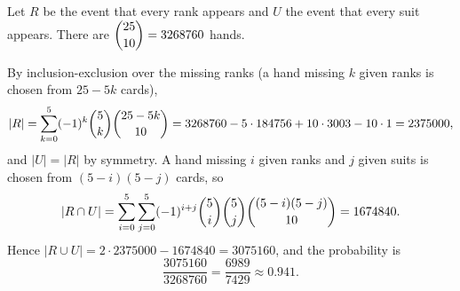 Let $R$ be the event that every rank appears and $U$ the event that every suit appears. There are $\dbinom{25}{10}=3268760$ hands.

By inclusion-exclusion over the missing ranks (a hand missing $k$ given ranks is chosen from $25-5k$ cards),
\[
|R|=\sum_{k=0}^{5}(-1)^k\dbinom5k\dbinom{25-5k}{10}=3268760-5\cdot184756+10\cdot3003-10\cdot1=2375000,
\]
and $|U|=|R|$ by symmetry. A hand missing $i$ given ranks and $j$ given suits is chosen from $(5-i)(5-j)$ cards, so
\[
|R\cap U|=\sum_{i=0}^{5}\sum_{j=0}^{5}(-1)^{i+j}\dbinom5i\dbinom5j\dbinom{(5-i)(5-j)}{10}=1674840 .
\]
Hence $|R\cup U|=2\cdot2375000-1674840=3075160$, and the probability is
\[
\dfrac{3075160}{3268760}=\boxed{\dfrac{6989}{7429}}\approx0.941 .
\]
